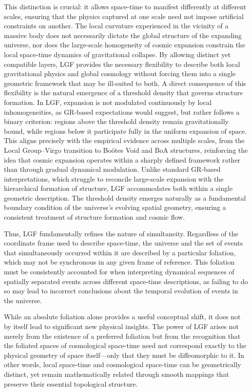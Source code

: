 \documentclass[aps,prd,reprint,superscriptaddress]{revtex4-2}
\begin{document}
This distinction is crucial: it allows space-time to manifest differently at different scales, ensuring that the physics captured at one scale need not impose artificial constraints on another. The local curvature experienced in the vicinity of a massive body does not necessarily dictate the global structure of the expanding universe, nor does the large-scale homogeneity of cosmic expansion constrain the local space-time dynamics of gravitational collapse. By allowing distinct yet compatible layers, LGF provides the necessary flexibility to describe both local gravitational physics and global cosmology without forcing them into a single geometric framework that may be ill-suited to both. A direct consequence of this flexibility is the natural emergence of a threshold density that governs structure formation. In LGF, expansion is not modulated continuously by local inhomogeneities, as GR-based expectations would suggest, but rather follows a binary criterion: regions above the threshold density remain gravitationally bound, while regions below it participate fully in the uniform expansion of space. This aligns precisely with the empirical evidence across multiple scales, from the Local Group–Virgo transition to Bo\"{o}tes Void and BoA structures, reinforcing the idea that cosmic expansion operates within a sharply defined framework rather than through gradual dynamical modulation. Unlike standard GR-based interpretations, which struggle to reconcile large-scale expansion with the hierarchical formation of structure, LGF accommodates both within a single geometric description. The threshold density emerges naturally as a fundamental boundary condition of the universe's evolving spatial geometry, ensuring a consistent treatment of structure formation and cosmic flow.

Thus, LGF fundamentally refines the nature of simultaneity. Regardless of the coordinate frame used to describe space-time, the universe and the set of events that simultaneously occurred within it are described by a particular foliation, which may not be synchronous in any given frame of reference. This foliation must be consistently accounted for when interpreting dynamical sequences of spatially separated events across different space-time descriptions, as failing to do so may lead to incorrect conclusions about the temporal evolution of events in the universe. 

While an absolute foliation alone provides a useful conceptual shift, it does not by itself lead to significant new physical insights. The power of LGF arises not merely from the existence of a preferred foliation but from the recognition that the foliated spaces of cosmological space-time need not correspond exactly to the physical geometry of space itself---only that they must be diffeomorphic to it. In other words, local space-time and cosmological space-time can be geometrically distinct, yet remain mathematically related through smooth mappings that preserve their essential topological structure.
\end{document}
